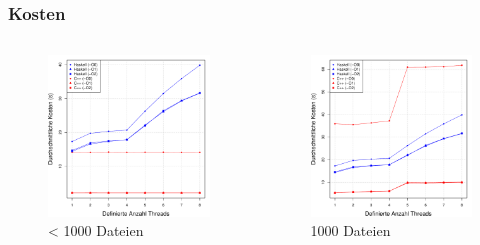 \documentclass[presentation, shownotes]{beamer}
\begin{document}
\begin{frame}
\frametitle{Kosten}
\begin{columns}[c]
    \begin{figure}
        \includegraphics[width=\textwidth]{cost_sub1000_desktop.pdf}
        \caption{< 1000 Dateien}
    \end{figure}

    \begin{figure}
        \includegraphics[width=\textwidth]{cost_1000_desktop.pdf}
        \caption{1000 Dateien}
    \end{figure}
\end{columns}
\end{frame}
\end{document}
